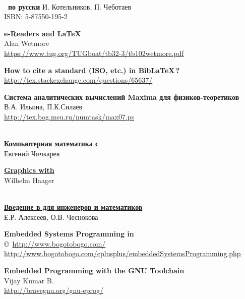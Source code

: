 \begin{thebibliography}{99}
\ \\
\textbf{\LaTeXe\ по русски}
И. Котельников, П. Чеботаев\\
ISBN: 5-87550-195-2

\textbf{e-Readers and \LaTeX}\\
Alan Wetmore\\
\url{https://www.tug.org/TUGboat/tb32-3/tb102wetmore.pdf}

\textbf{How to cite a standard (ISO, etc.) in Bib\LaTeX\,?}\\
\url{http://tex.stackexchange.com/questions/65637/}


\textbf{Система аналитических вычислений Maxima для физиков-теоретиков}\\
В.А. Ильина, П.К.Силаев\\
\url{http://tex.bog.msu.ru/numtask/max07.ps}

\ \\
\href{http://shop.altlinux.ru/index.php?productID=750}{\textbf{Компьютерная
математика с }}\\
Евгений Чичкарев

\href{http://www.austromath.at/daten/maxima/zusatz/Graphics_with_Maxima.pdf}{\textbf{Graphics
with \maxima}}\\
Wilhelm Haager

\ \\
\href{http://shop.altlinux.ru/index.php?productID=751}{\textbf{Введение в
 для инженеров и математиков}}\\
Е.Р. Алексеев, О.В. Чеснокова 




\textbf{Embedded Systems Programming in \cpp}\\
\copyright\ \url{http://www.bogotobogo.com/}\\
\url{http://www.bogotobogo.com/cplusplus/embeddedSystemsProgramming.php}

\textbf{Embedded Programming with the GNU Toolchain}\\
Vijay Kumar B.\\
\url{http://bravegnu.org/gnu-eprog/}


\end{thebibliography}
